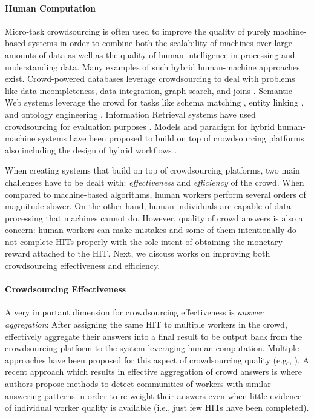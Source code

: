 \paragraph{Human Computation}
Micro-task crowdsourcing is often used to improve the quality of purely machine-based systems in order to combine both the scalability of machines over large amounts of data as well as the quality of human intelligence in processing and understanding data.
Many examples of such hybrid human-machine approaches exist.
% 
Crowd-powered databases \cite{crowddb} leverage crowdsourcing to deal with problems like  data incompleteness,  data integration, graph search, and joins \cite{crowder,graphsearch,crowdjoins}.
% 
Semantic Web systems leverage the crowd for tasks like schema matching \cite{crowdmap}, entity linking \cite{zencrowd}, and ontology engineering \cite{bioonto}.
% 
Information Retrieval systems have used crowdsourcing for evaluation purposes \cite{mizzaroalonso}.
% 
Models and paradigm for hybrid human-machine systems have been proposed to build on top of crowdsourcing platforms \cite{crowdcomputer} also including the design of hybrid workflows \cite{workflows}.

When creating systems that build on top of crowdsourcing platforms, two main challenges have to be dealt with: \emph{effectiveness} and \emph{efficiency}  of the crowd. When compared to machine-based algorithms, human workers perform several orders of magnitude slower. On the other hand, human individuals are capable of data processing that machines cannot do. However, quality of crowd answers is also a concern: human workers can make mistakes and some of them intentionally do not complete HITs properly with the sole intent of obtaining the monetary reward attached to the HIT. Next, we discuss works on improving both crowdsourcing effectiveness and efficiency.





\paragraph{Crowdsourcing Effectiveness}
A very important dimension for crowdsourcing effectiveness is \emph{answer aggregation}: After assigning the same HIT to multiple workers in the crowd, effectively aggregate their answers into a final result to be output back from the crowdsourcing platform to the system leveraging human computation. Multiple approaches have been proposed for this aspect of crowdsourcing quality (e.g.,
\cite{Venanzi:2014:CBA:2566486.2567989,square,zencrowd,Hosseini:2012:ALM:2260641.2260661}).
% 
A recent approach which results in effective aggregation of crowd answers is \cite{Venanzi:2014:CBA:2566486.2567989} where authors propose methods to detect communities of workers with similar answering patterns in order to re-weight their answers even when little evidence of individual worker quality is available (i.e., just few HITs have been completed).

